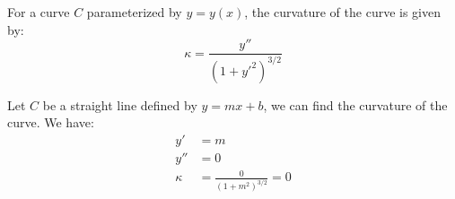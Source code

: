 \documentclass[11pt]{report}
\begin{document}
\begin{theorem}
    For a curve $C$ parameterized by $y = y(x)$, the curvature of the curve is given by:
    \begin{equation}
        \kappa = \frac{y''}{(1 + y'^2)^{3/2}}
    \end{equation}
\end{theorem}
\begin{example}
    Let $C$ be a straight line defined by $y = mx + b$, we can find the curvature of the curve. We have:
    \begin{align*}
        y' &= m \\
        y'' &= 0 \\
        \kappa &= \frac{0}{(1 + m^2)^{3/2}} = 0
    \end{align*}
\end{example}
\end{document}
